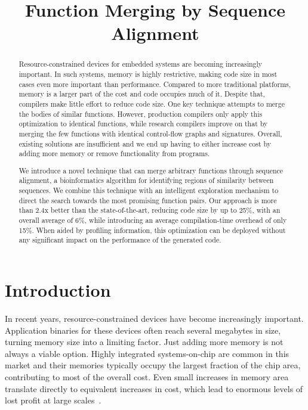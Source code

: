 \documentclass[10pt,twocolumn,nocopyrightspace]{sigplanconf}
\title{Function Merging by Sequence Alignment\vspace{-2em}}
\begin{document}
\maketitle

\begin{abstract}
Resource-constrained devices for embedded systems are becoming increasingly important.
In such systems, memory is highly restrictive, making code size in most cases
even more important than performance.
Compared to more traditional platforms, memory is a larger part of the cost and
code occupies much of it. Despite that, compilers make little effort to reduce
code size.
One key technique attempts to merge the bodies of similar functions.
However, production compilers only apply this optimization to identical functions,
while research compilers improve on that by merging the few functions with
identical control-flow graphs and signatures.
Overall, existing solutions are insufficient and we end up having to either increase cost by adding more memory or remove functionality from programs.

We introduce a novel technique that can merge arbitrary functions through sequence
alignment, a bioinformatics algorithm for identifying regions of similarity
between sequences. We combine this technique with an intelligent exploration
mechanism to direct the search towards the most promising function pairs. Our
approach is more than 2.4x better than the state-of-the-art, reducing code
size by up to 25\%, with an overall average of 6\%, while introducing an
average compilation-time overhead of only 15\%. When aided by profiling information,
this optimization can be deployed without any significant impact
on the performance of the generated code.
\end{abstract}

\section{Introduction}
\label{sec:introduction}

In recent years, resource-constrained devices have become increasingly
important. Application binaries for these devices often reach several megabytes
in size, turning memory size into a limiting factor. Just adding more
memory is not always a viable option. Highly integrated systems-on-chip are
common in this market and their memories typically occupy the largest fraction
of the chip area, contributing to most of the overall cost. Even small
increases in memory area translate directly to equivalent increases in cost,
which lead to enormous levels of lost profit at large scales~\cite{edler10}.
\end{document}
